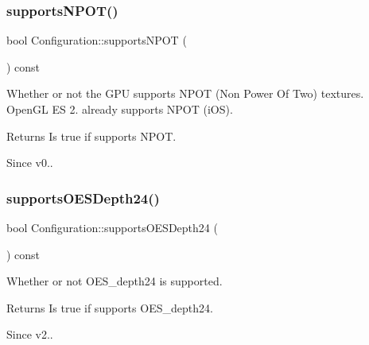 \subsubsection{\texorpdfstring{supports\+N\+P\+O\+T()}{supportsNPOT()}\hspace{0.1cm}{\footnotesize\ttfamily [2/2]}}
{\footnotesize\ttfamily bool Configuration\+::supports\+N\+P\+OT (\begin{DoxyParamCaption}{ }\end{DoxyParamCaption}) const}

Whether or not the G\+PU supports N\+P\+OT (Non Power Of Two) textures. Open\+GL ES 2. already supports N\+P\+OT (i\+OS).

\begin{DoxyReturn}{Returns}
Is true if supports N\+P\+OT. 
\end{DoxyReturn}
\begin{DoxySince}{Since}
v0.. 
\end{DoxySince}
\mbox{\label{classConfiguration_a4a522f90b542f8aae0cfcfbfbb9c6ee5}} 
\subsubsection{\texorpdfstring{supports\+O\+E\+S\+Depth24()}{supportsOESDepth24()}\hspace{0.1cm}{\footnotesize\ttfamily [1/2]}}
{\footnotesize\ttfamily bool Configuration\+::supports\+O\+E\+S\+Depth24 (\begin{DoxyParamCaption}{ }\end{DoxyParamCaption}) const}

Whether or not O\+E\+S\+\_\+depth24 is supported.

\begin{DoxyReturn}{Returns}
Is true if supports O\+E\+S\+\_\+depth24. 
\end{DoxyReturn}
\begin{DoxySince}{Since}
v2.. 
\end{DoxySince}
\mbox{\label{classConfiguration_a4a522f90b542f8aae0cfcfbfbb9c6ee5}} 
